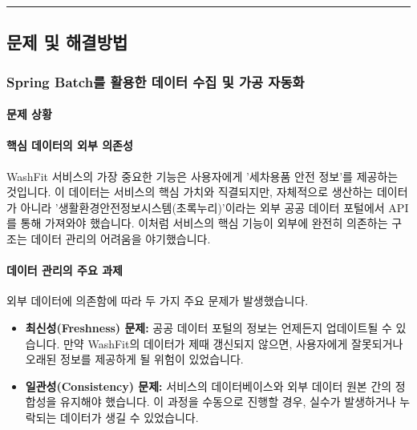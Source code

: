 \documentclass[12pt,a4paper]{article}
\newcommand{\divider}{%
    \vspace{0.5cm}%
    \begin{center}%
    \textcolor{lightgray}{\rule{0.2\textwidth}{0.5pt}}%
    \end{center}%
    \vspace{0.5cm}%
}
\begin{document}
    \divider

    \subsection{문제 및 해결방법}

    \subsubsection{Spring Batch를 활용한 데이터 수집 및 가공 자동화}


    \paragraph{문제 상황}


    \paragraph{핵심 데이터의 외부 의존성} \par
    WashFit 서비스의 가장 중요한 기능은 사용자에게 '세차용품 안전 정보'를 제공하는 것입니다. 이 데이터는 서비스의 핵심 가치와 직결되지만, 자체적으로 생산하는 데이터가 아니라 '생활환경안전정보시스템(초록누리)'이라는 외부 공공 데이터 포털에서 API를 통해 가져와야 했습니다. 이처럼 서비스의 핵심 기능이 외부에 완전히 의존하는 구조는 데이터 관리의 어려움을 야기했습니다.

    \vspace{1em}


    \paragraph{데이터 관리의 주요 과제} \par
    외부 데이터에 의존함에 따라 두 가지 주요 문제가 발생했습니다.
    \begin{itemize}
        \item \textbf{최신성(Freshness) 문제:} 공공 데이터 포털의 정보는 언제든지 업데이트될 수 있습니다. 만약 WashFit의 데이터가 제때 갱신되지 않으면, 사용자에게 잘못되거나 오래된 정보를 제공하게 될 위험이 있었습니다.
        \item \textbf{일관성(Consistency) 문제:} 서비스의 데이터베이스와 외부 데이터 원본 간의 정합성을 유지해야 했습니다. 이 과정을 수동으로 진행할 경우, 실수가 발생하거나 누락되는 데이터가 생길 수 있었습니다.
    \end{itemize}
\end{document}
